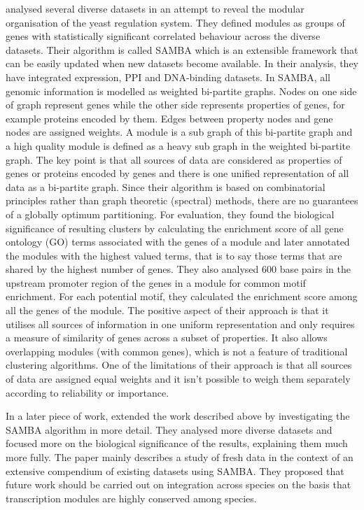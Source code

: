 \citet{AmosTanay04revealing} analysed several diverse datasets in an attempt to reveal the modular organisation of the yeast regulation system. They defined modules as groups of genes with statistically significant correlated behaviour across the diverse datasets. Their algorithm is called \ac{SAMBA} which is an extensible framework that can be easily updated when new datasets become available. In their analysis, they have integrated expression, PPI and DNA-binding datasets. In \ac{SAMBA}, all genomic information is modelled as weighted bi-partite graphs. Nodes on one side of graph represent genes while the other side represents properties of genes, for example proteins encoded by them. Edges between property nodes and gene nodes are assigned weights. A module is a sub graph of this bi-partite graph and a high quality module is defined as a heavy sub graph in the weighted bi-partite graph. The key point is that all sources of data are considered as properties of genes or proteins encoded by genes and there is one unified representation of all data as a bi-partite graph. Since their algorithm is based on combinatorial principles rather than graph theoretic (spectral) methods, there are no guarantees of a globally optimum partitioning. For evaluation, they found the biological significance of resulting clusters by calculating the enrichment score of all gene ontology (GO) terms associated with the genes of a module and later annotated the modules with the highest valued terms, that is to say those terms that are shared by the highest number of genes. They also analysed 600 base pairs in the upstream promoter region of the genes in a module for common motif enrichment. For each potential motif, they calculated the enrichment score among all the genes of the module. The positive aspect of their approach is that it utilises all sources of information in one uniform representation and only requires a measure of similarity of genes across a subset of properties. It also allows overlapping modules (with common genes), which is not a feature of traditional clustering algorithms. One of the limitations of their approach is that all sources of data are assigned equal weights and it isn't possible to weigh them separately according to reliability or importance. 

In a later piece of work, \citet{amos05integrative} extended the work described above by investigating the \ac{SAMBA} algorithm in more detail. They analysed more diverse datasets and focused more on the biological significance of the results, explaining them much more fully. The paper mainly describes a study of fresh data in the context of an extensive compendium of existing datasets using \ac{SAMBA}. They proposed that future work should be carried out on integration across species on the basis that transcription modules are highly conserved among species. 

